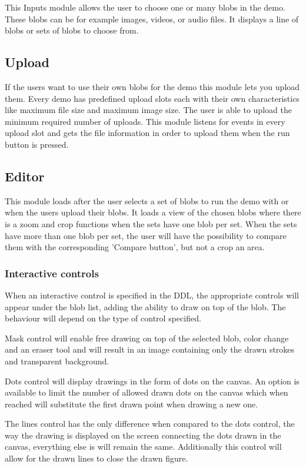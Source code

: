 This Inputs module allows the user to choose one or many blobs in the demo. These blobs can be for example images, videos, or audio files. It displays a line of blobs or sets of blobs to choose from.


\subsection{Upload}
If the users want to use their own blobs for the demo this module lets you upload them. Every demo has predefined 
upload slots each with their own characteristics like maximum file size and maximum image size. The user is able to upload the 
minimum required number of uploads. This module listens for events in every upload slot and gets the file information in order to 
upload them when the run button is pressed.


\subsection{Editor}
This module loads after the user selects a set of blobs to run the demo with or when the users upload their blobs. It loads a view of
the chosen blobs where there is a zoom and crop functions when the sets have one blob per set. When the sets have more than 
one blob per set, the user will have the possibility to compare them with the corresponding 'Compare button', but not a crop 
an area.

\subsubsection{Interactive controls}
When an interactive control is specified in the DDL, the appropriate controls will appear under the blob list, adding the ability to draw on top of the blob. The behaviour will depend on the type of control specified. 

Mask control will enable free drawing on top of the selected blob, color change and an eraser tool and will result in an image containing only the drawn strokes and transparent background.

Dots control will display drawings in the form of dots on the canvas. An option is available to limit the number of allowed drawn dots on the canvas which when reached will substitute the first drawn point when drawing a new one.

The lines control has the only difference when compared to the dots control,  the way the drawing is displayed on the screen connecting the dots drawn in the canvas, everything else is will remain the same. Additionally this control will allow for the drawn lines to close the drawn figure.

